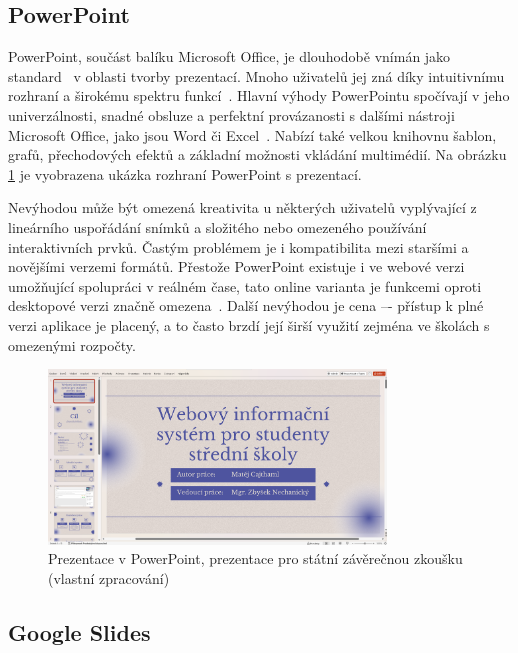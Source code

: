 \subsection{PowerPoint}

PowerPoint, součást balíku Microsoft Office, je dlouhodobě vnímán jako standard~\cite{pp_usage} v oblasti tvorby prezentací.
Mnoho uživatelů jej zná díky intuitivnímu rozhraní a širokému spektru funkcí~\cite{pp_usage}.
Hlavní výhody PowerPointu spočívají v jeho univerzálnosti, snadné obsluze a perfektní provázanosti s dalšími nástroji Microsoft Office, jako jsou Word či Excel~\cite{pp_excel, pp_word}.
Nabízí také velkou knihovnu šablon, grafů, přechodových efektů a základní možnosti vkládání multimédií.
Na obrázku \ref{fig:analyza/powerpoint} je vyobrazena ukázka rozhraní PowerPoint s prezentací. 

Nevýhodou může být omezená kreativita u některých uživatelů vyplývající z lineárního uspořádání snímků a složitého nebo omezeného používání interaktivních prvků. 
Častým problémem je i kompatibilita mezi staršími a novějšími verzemi formátů.
Přestože PowerPoint existuje i ve webové verzi umožňující spolupráci v reálném čase, tato online varianta je funkcemi oproti desktopové verzi značně omezena~\cite{pp_platforms}.
Další nevýhodou je cena –- přístup k plné verzi aplikace je placený, a to často brzdí její širší využití zejména ve školách s omezenými rozpočty.

\begin{figure}[ht!]
    \centering
    \includegraphics[width=0.8\textwidth]{media/03_analyza/powerpoint.png}
    \caption{Prezentace v PowerPoint, prezentace pro státní závěrečnou zkoušku (vlastní zpracování)}
    \label{fig:analyza/powerpoint}
\end{figure}


\subsection{Google Slides}\label{text:google_slides}

